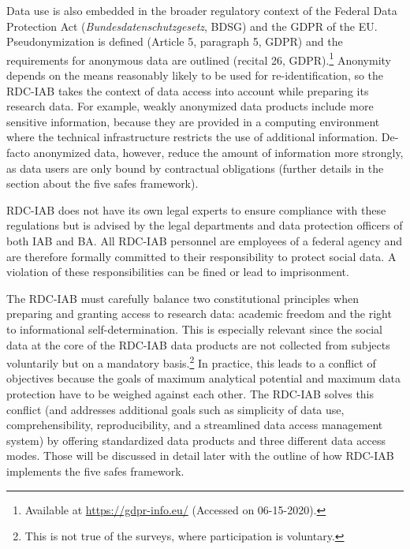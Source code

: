 Data use is also embedded in the broader regulatory context of the Federal Data Protection Act (\emph{Bundesdatenschutzgesetz}, BDSG) and the GDPR of the EU. Pseudonymization is defined (Article 5, paragraph 5, GDPR) and the requirements for anonymous data are outlined (recital 26, GDPR).\footnote{Available at \url{https://gdpr-info.eu/} (Accessed on 06-15-2020).} Anonymity depends on the means reasonably likely to be used for re-identification, so the RDC-IAB takes the context of data access into account while preparing its research data. For example, weakly anonymized data products include more sensitive information, because they are provided in a computing environment where the technical infrastructure restricts the use of additional information. De-facto anonymized data, however, reduce the amount of information more strongly, as data users are only bound by contractual obligations (further details in the section about the five safes framework).

RDC-IAB does not have its own legal experts to ensure compliance with these regulations but is advised by the legal departments and data protection officers of both IAB and BA. All RDC-IAB personnel are employees of a federal agency and are therefore formally committed to their responsibility to protect social data. A violation of these responsibilities can be fined or lead to imprisonment.

The RDC-IAB must carefully balance two constitutional principles when preparing and granting access to research data: academic freedom and the right to informational self-determination. This is especially relevant since the social data at the core of the RDC-IAB data products are not collected from subjects voluntarily but on a mandatory basis.\footnote{This is not true of the surveys, where participation is voluntary.} In practice, this leads to a conflict of objectives because the goals of maximum analytical potential and maximum data protection have to be weighed against each other. The RDC-IAB solves this conflict (and addresses additional goals such as simplicity of data use, comprehensibility, reproducibility, and a streamlined data access management system) by offering standardized data products and three different data access modes. Those will be discussed in detail later with the outline of how RDC-IAB implements the five safes framework.


